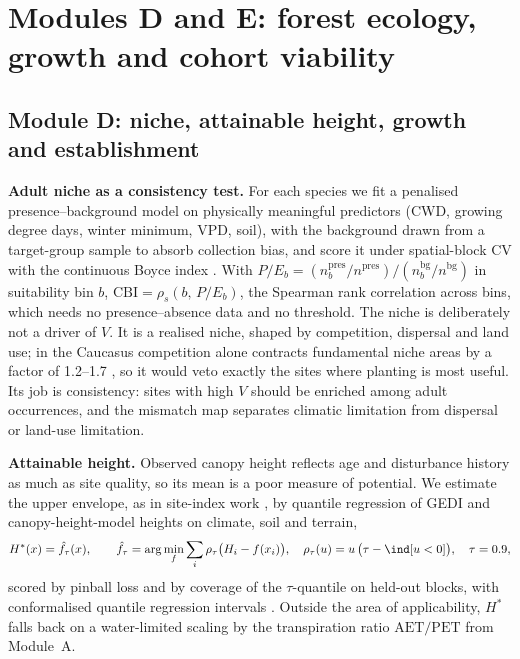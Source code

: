 \section{Modules D and E: forest ecology, growth and cohort viability}\label{sec:DE}

\subsection{Module D: niche, attainable height, growth and establishment}\label{sec:D}
\textbf{Adult niche as a consistency test.} For each species we fit a penalised presence--background model on physically meaningful predictors (CWD, growing degree days, winter minimum, VPD, soil), with the background drawn from a target-group sample to absorb collection bias, and score it under spatial-block CV with the continuous Boyce index \citep{Hirzel2006}. With $P/E_b=(n^{\text{pres}}_b/n^{\text{pres}})/(n^{\text{bg}}_b/n^{\text{bg}})$ in suitability bin $b$, $\mathrm{CBI}=\rho_s(b,\,P/E_b)$, the Spearman rank correlation across bins, which needs no presence--absence data and no threshold. The niche is deliberately not a driver of $V$. It is a realised niche, shaped by competition, dispersal and land use; in the Caucasus competition alone contracts fundamental niche areas by a factor of 1.2--1.7 \citep{Pshegusov2022}, so it would veto exactly the sites where planting is most useful. Its job is consistency: sites with high $V$ should be enriched among adult occurrences, and the mismatch map separates climatic limitation from dispersal or land-use limitation.

\textbf{Attainable height.} Observed canopy height reflects age and disturbance history as much as site quality, so its mean is a poor measure of potential. We estimate the upper envelope, as in site-index work \citep{Skovsgaard2008}, by quantile regression \citep{Cade2003} of GEDI and canopy-height-model heights on climate, soil and terrain,
\begin{equation}\label{eq:qr}
H^\ast(x)=\hat f_\tau(x),\qquad \hat f_\tau=\arg\min_f\sum_i\rho_\tau\big(H_i-f(x_i)\big),\quad \rho_\tau(u)=u\,\big(\tau-\ind[u<0]\big),\quad\tau=0.9,
\end{equation}
scored by pinball loss and by coverage of the $\tau$-quantile on held-out blocks, with conformalised quantile regression intervals \citep{Romano2019}. Outside the area of applicability, $H^\ast$ falls back on a water-limited scaling by the transpiration ratio $\mathrm{AET}/\mathrm{PET}$ from Module~A.

